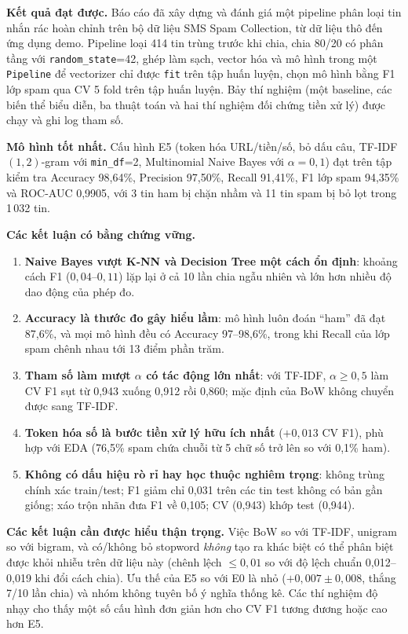 
\textbf{Kết quả đạt được.} Báo cáo đã xây dựng và đánh giá một pipeline phân loại tin nhắn rác hoàn chỉnh trên bộ dữ liệu SMS Spam Collection, từ dữ liệu thô đến ứng dụng demo. Pipeline loại 414 tin trùng trước khi chia, chia 80/20 có phân tầng với \texttt{random\_state}=42, ghép làm sạch, vector hóa và mô hình trong một \texttt{Pipeline} để vectorizer chỉ được \texttt{fit} trên tập huấn luyện, chọn mô hình bằng F1 lớp spam qua CV 5 fold trên tập huấn luyện. Bảy thí nghiệm (một baseline, các biến thể biểu diễn, ba thuật toán và hai thí nghiệm đối chứng tiền xử lý) được chạy và ghi log tham số.

\textbf{Mô hình tốt nhất.} Cấu hình E5 (token hóa URL/tiền/số, bỏ dấu câu, TF-IDF $(1,2)$-gram với \texttt{min\_df}=2, Multinomial Naive Bayes với $\alpha=0{,}1$) đạt trên tập kiểm tra Accuracy 98,64\%, Precision 97,50\%, Recall 91,41\%, F1 lớp spam 94,35\% và ROC-AUC 0,9905, với 3 tin ham bị chặn nhầm và 11 tin spam bị bỏ lọt trong 1\,032 tin.

\textbf{Các kết luận có bằng chứng vững.}
\begin{enumerate}[label=(\arabic*)]
    \item \textbf{Naive Bayes vượt K-NN và Decision Tree một cách ổn định}: khoảng cách F1 ($0{,}04$--$0{,}11$) lặp lại ở cả 10 lần chia ngẫu nhiên và lớn hơn nhiều độ dao động của phép đo.
    \item \textbf{Accuracy là thước đo gây hiểu lầm}: mô hình luôn đoán ``ham'' đã đạt 87,6\%, và mọi mô hình đều có Accuracy 97--98,6\%, trong khi Recall của lớp spam chênh nhau tới 13 điểm phần trăm.
    \item \textbf{Tham số làm mượt $\alpha$ có tác động lớn nhất}: với TF-IDF, $\alpha\ge0{,}5$ làm CV F1 sụt từ 0,943 xuống 0,912 rồi 0,860; mặc định của BoW không chuyển được sang TF-IDF.
    \item \textbf{Token hóa số là bước tiền xử lý hữu ích nhất} ($+0{,}013$ CV F1), phù hợp với EDA (76,5\% spam chứa chuỗi từ 5 chữ số trở lên so với 0,1\% ham).
    \item \textbf{Không có dấu hiệu rò rỉ hay học thuộc nghiêm trọng}: không trùng chính xác train/test; F1 giảm chỉ 0,031 trên các tin test không có bản gần giống; xáo trộn nhãn đưa F1 về 0,105; CV (0,943) khớp test (0,944).
\end{enumerate}

\textbf{Các kết luận cần được hiểu thận trọng.} Việc BoW so với TF-IDF, unigram so với bigram, và có/không bỏ stopword \textit{không} tạo ra khác biệt có thể phân biệt được khỏi nhiễu trên dữ liệu này (chênh lệch $\le0{,}01$ so với độ lệch chuẩn 0,012--0,019 khi đổi cách chia). Ưu thế của E5 so với E0 là nhỏ ($+0{,}007\pm0{,}008$, thắng 7/10 lần chia) và nhóm không tuyên bố ý nghĩa thống kê. Các thí nghiệm độ nhạy cho thấy một số cấu hình đơn giản hơn cho CV F1 tương đương hoặc cao hơn E5.

